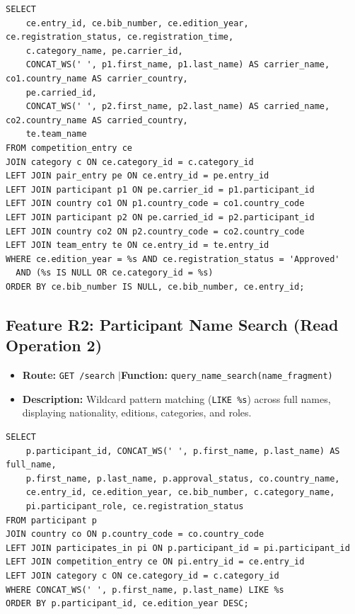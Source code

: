 \documentclass[11pt,a4paper]{article}
\begin{document}
\begin{lstlisting}
SELECT 
    ce.entry_id, ce.bib_number, ce.edition_year, ce.registration_status, ce.registration_time,
    c.category_name, pe.carrier_id,
    CONCAT_WS(' ', p1.first_name, p1.last_name) AS carrier_name, co1.country_name AS carrier_country,
    pe.carried_id,
    CONCAT_WS(' ', p2.first_name, p2.last_name) AS carried_name, co2.country_name AS carried_country,
    te.team_name
FROM competition_entry ce
JOIN category c ON ce.category_id = c.category_id
LEFT JOIN pair_entry pe ON ce.entry_id = pe.entry_id
LEFT JOIN participant p1 ON pe.carrier_id = p1.participant_id
LEFT JOIN country co1 ON p1.country_code = co1.country_code
LEFT JOIN participant p2 ON pe.carried_id = p2.participant_id
LEFT JOIN country co2 ON p2.country_code = co2.country_code
LEFT JOIN team_entry te ON ce.entry_id = te.entry_id
WHERE ce.edition_year = %s AND ce.registration_status = 'Approved'
  AND (%s IS NULL OR ce.category_id = %s)
ORDER BY ce.bib_number IS NULL, ce.bib_number, ce.entry_id;
\end{lstlisting}

\subsection{Feature R2: Participant Name Search (Read Operation 2)}
\begin{itemize}[leftmargin=1.5em, itemsep=0.5pt, topsep=0.5pt]
  \item \textbf{Route:} \texttt{GET /search} \quad$\vert$\quad \textbf{Function:} \texttt{query\_name\_search(name\_fragment)}
  \item \textbf{Description:} Wildcard pattern matching (\texttt{LIKE \%s}) across full names, displaying nationality, editions, categories, and roles.
\end{itemize}

\begin{lstlisting}
SELECT 
    p.participant_id, CONCAT_WS(' ', p.first_name, p.last_name) AS full_name,
    p.first_name, p.last_name, p.approval_status, co.country_name,
    ce.entry_id, ce.edition_year, ce.bib_number, c.category_name,
    pi.participant_role, ce.registration_status
FROM participant p
JOIN country co ON p.country_code = co.country_code
LEFT JOIN participates_in pi ON p.participant_id = pi.participant_id
LEFT JOIN competition_entry ce ON pi.entry_id = ce.entry_id
LEFT JOIN category c ON ce.category_id = c.category_id
WHERE CONCAT_WS(' ', p.first_name, p.last_name) LIKE %s
ORDER BY p.participant_id, ce.edition_year DESC;
\end{lstlisting}
\end{document}
